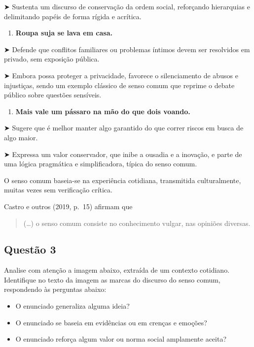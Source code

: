 \documentclass[
  letterpaper,
  DIV=11,
  numbers=noendperiod]{scrreprt}
\providecommand{\tightlist}{%
  \setlength{\itemsep}{0pt}\setlength{\parskip}{0pt}}
\begin{document}
➤ Sustenta um discurso de conservação da ordem social, reforçando
hierarquias e delimitando papéis de forma rígida e acrítica.

\begin{enumerate}
\def\labelenumi{\arabic{enumi}.}
\setcounter{enumi}{3}
\tightlist
\item
  \textbf{Roupa suja se lava em casa.}
\end{enumerate}

➤ Defende que conflitos familiares ou problemas íntimos devem ser
resolvidos em privado, sem exposição pública.

➤ Embora possa proteger a privacidade, favorece o silenciamento de
abusos e injustiças, sendo um exemplo clássico de senso comum que
reprime o debate público sobre questões sensíveis.

\begin{enumerate}
\def\labelenumi{\arabic{enumi}.}
\setcounter{enumi}{4}
\tightlist
\item
  \textbf{Mais vale um pássaro na mão do que dois voando.}
\end{enumerate}

➤ Sugere que é melhor manter algo garantido do que correr riscos em
busca de algo maior.

➤ Expressa um valor conservador, que inibe a ousadia e a inovação, e
parte de uma lógica pragmática e simplificadora, típica do senso comum.

O senso comum baseia-se na experiência cotidiana, transmitida
culturalmente, muitas vezes sem verificação crítica.

Castro e outros (2019, p.~15) afirmam que

\begin{quote}
(\ldots) o senso comum consiste no conhecimento vulgar, nas opiniões
diversas.
\end{quote}

\subsection{Questão 3}\label{questuxe3o-3-2}

Analise com atenção a imagem abaixo, extraída de um contexto cotidiano.
Identifique no texto da imagem as marcas do discurso do senso comum,
respondendo às perguntas abaixo:

\begin{itemize}
\item
  O enunciado generaliza alguma ideia?
\item
  O enunciado se baseia em evidências ou em crenças e emoções?
\item
  O enunciado reforça algum valor ou norma social amplamente aceita?
\end{itemize}
\end{document}
